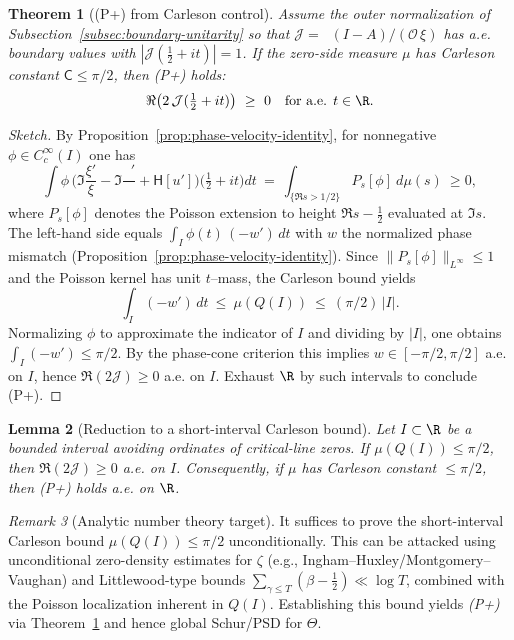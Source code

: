 \documentclass[11pt]{article}
\newtheorem{theorem}{Theorem}
\newtheorem{lemma}[theorem]{Lemma}
\theoremstyle{remark}
\newtheorem{remark}[theorem]{Remark}
\DeclareMathOperator{\dettwo}{det_2}
\begin{document}
\begin{theorem}[(P+) from Carleson control]\label{thm:Pplus-from-Carleson}
Assume the outer normalization of Subsection~\ref{subsec:boundary-unitarity} so that \(\mathcal J=\dettwo(I-A)/(\mathcal O\,\xi)\) has a.e. boundary values with \(|\mathcal J(\tfrac12+it)|=1\). If the zero-side measure \(\mu\) has Carleson constant \(\mathsf C\le \pi/2\), then \emph{(P+)} holds:
\[
 \Re\big(2\,\mathcal J(\tfrac12+it)\big)\ \ge\ 0\quad\text{for a.e. }t\in\R.
\]
\end{theorem}
\begin{proof}[Sketch]
By Proposition~\ref{prop:phase-velocity-identity}, for nonnegative \(\phi\in C_c^\infty(I)\) one has
\[
 \int\!\phi\,\Big(\Im\frac{\xi'}{\xi}-\Im\frac{\dettwo'}{\dettwo}+\mathsf H[u']\Big)\Big(\tfrac12+it\Big)dt\ =\ \int_{\{\Re s>1/2\}} P_{s}\![\phi] \ d\mu(s)\ \ge 0,
\]
where \(P_{s}[\phi]\) denotes the Poisson extension to height \(\Re s-\tfrac12\) evaluated at \(\Im s\). The left-hand side equals \(\int_I \phi(t)\,(-w')\,dt\) with \(w\) the normalized phase mismatch (Proposition~\ref{prop:phase-velocity-identity}). Since \(\|P_{s}[\phi]\|_{L^\infty}\le 1\) and the Poisson kernel has unit \(t\)–mass, the Carleson bound yields
\[
 \int_I (-w')\,dt\ \le\ \mu(Q(I))\ \le\ (\pi/2)\,|I|.
\]
Normalizing \(\phi\) to approximate the indicator of \(I\) and dividing by \(|I|\), one obtains \(\int_I (-w')\le \pi/2\). By the phase-cone criterion this implies \(w\in[-\pi/2,\pi/2]\) a.e. on \(I\), hence \(\Re(2\mathcal J)\ge 0\) a.e. on \(I\). Exhaust \(\R\) by such intervals to conclude (P+).
\end{proof}

\begin{lemma}[Reduction to a short-interval Carleson bound]\label{lem:HP-Carleson}
Let \(I\subset\R\) be a bounded interval avoiding ordinates of critical-line zeros. If \(\mu(Q(I))\le \pi/2\), then \(\Re(2\mathcal J)\ge 0\) a.e. on \(I\). Consequently, if \(\mu\) has Carleson constant \(\le \pi/2\), then \emph{(P+)} holds a.e. on \(\R\).
\end{lemma}
\begin{remark}[Analytic number theory target]
It suffices to prove the short-interval Carleson bound \(\mu(Q(I))\le \pi/2\) unconditionally. This can be attacked using unconditional zero-density estimates for \(\zeta\) (e.g., Ingham–Huxley/Montgomery–Vaughan) and Littlewood-type bounds \(\sum_{\gamma\le T}(\beta-\tfrac12)\ll \log T\), combined with the Poisson localization inherent in \(Q(I)\). Establishing this bound yields \emph{(P+)} via Theorem~\ref{thm:Pplus-from-Carleson} and hence global Schur/PSD for \(\Theta\).
\end{remark}
\end{document}

